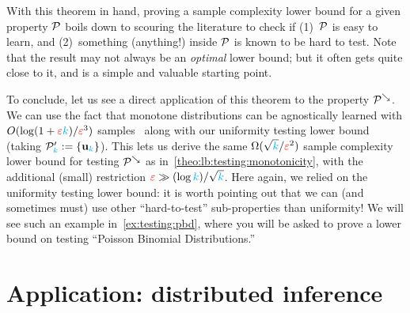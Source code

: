 With this theorem in hand, proving a sample complexity lower bound for a given property $\mathcal{P}$ boils down to scouring the literature to check if (1)~$\mathcal{P}$ is easy to learn, and (2)~something (anything!) inside $\mathcal{P}$ is known to be hard to test. Note that the result may not always be an \emph{optimal} lower bound; but it often gets quite close to it, and is a simple and valuable starting point.\smallskip

To conclude, let us see a direct application of this theorem to the property $\mathcal{P}^{\searrow}$. We can use the fact that monotone distributions can be agnostically learned with $O(\log(1+\textcolor{red}{\varepsilon}{\textcolor{cyan}{k}})/\textcolor{red}{\varepsilon}^3)$ samples~\citep{Birge87,DDS:12} along with our uniformity testing lower bound (taking $\mathcal{P}'_{\textcolor{cyan}{k}} := \{\mathbf{u}_{\textcolor{cyan}{k}}\}$). This lets us derive the same $\Omega(\sqrt{{\textcolor{cyan}{k}}}/\textcolor{red}{\varepsilon}^2)$ sample complexity lower bound for testing $\mathcal{P}^{\searrow}$ as in~\cref{theo:lb:testing:monotonicity}, with the additional (small) restriction $\textcolor{red}{\varepsilon} \gg (\log{\textcolor{cyan}{k}})/\sqrt{{\textcolor{cyan}{k}}}$. Here again, we relied on the uniformity testing lower bound: it is worth pointing out that we can (and sometimes must) use other ``hard-to-test'' sub-properties than uniformity! We will see such an example in~\cref{ex:testing:pbd}, where you will be asked to prove a lower bound on testing ``Poisson Binomial Distributions.''

\section{Application: distributed inference}


